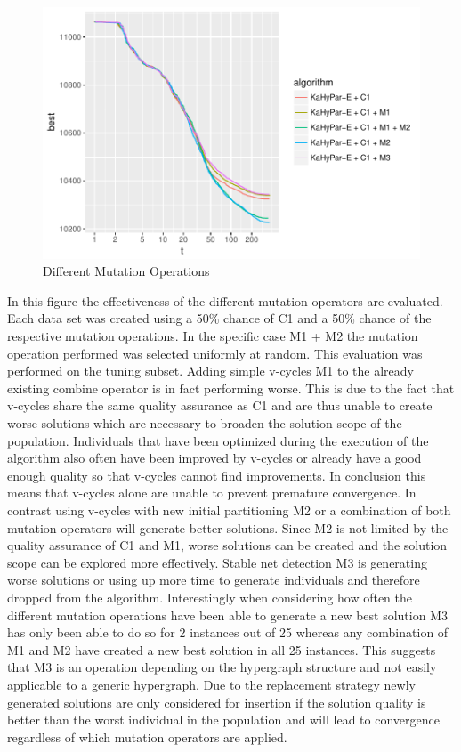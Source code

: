 \documentclass[a4paper,12pt,titlepage, BCOR7mm,headsepline]{scrbook}
\numberwithin{equation}{section}
\begin{document}
\begin{figure}[H]
\caption{Different Mutation Operations}
\begin{center}
\includegraphics{bachelorarbeit-differentoperatos}
\end{center}

\end{figure}
In this figure the effectiveness of the different mutation operators are evaluated. Each data set was created using a 50\% chance of C1 and a 50\% chance of the respective mutation operations. In the specific case M1 + M2 the mutation operation performed was selected uniformly at random. This evaluation was performed on the tuning subset. Adding simple v-cycles M1 to the already existing combine operator is in fact performing worse. This is due to the fact that v-cycles share the same quality assurance as C1 and are thus unable to create worse solutions which are necessary to broaden the solution scope of the population. Individuals that have been optimized during the execution of the algorithm also often have been improved by v-cycles or already have a good enough quality so that v-cycles cannot find improvements. In conclusion this means that v-cycles alone are unable to prevent premature convergence. In contrast using v-cycles with new initial partitioning M2 or a combination of both mutation operators will generate better solutions. Since M2 is not limited by the quality assurance of C1 and M1, worse solutions can be created and the solution scope can be explored more effectively. Stable net detection M3 is generating worse solutions or using up more time to generate individuals and therefore dropped from the algorithm. Interestingly when considering how often the different mutation operations have been able to generate a new best solution M3 has only been able to do so for 2 instances out of 25 whereas any combination of M1 and M2 have created a new best solution in all 25 instances. This suggests that M3 is an operation depending on the hypergraph structure and not easily applicable to a generic hypergraph. Due to the replacement strategy newly generated solutions are only considered for insertion if the solution quality is better than the worst individual in the population and will lead to convergence regardless of which mutation operators are applied. 
\end{document}
